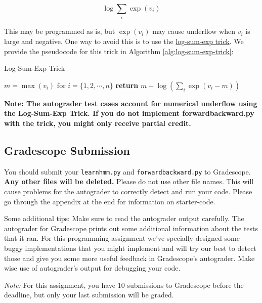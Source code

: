 \documentclass[11pt,addpoints,answers]{exam}
\begin{document}
$$ \log \sum_i \exp{(v_i)}$$

This may be programmed as is, but $\exp{(v_i)}$ may cause underflow when $v_i$ is large and negative. One way to avoid this is to use the \href{https://www.xarg.org/2016/06/the-log-sum-exp-trick-in-machine-learning/}{log-sum-exp trick}. We provide the pseudocode for this trick in Algorithm \ref{alg:log-sum-exp-trick}:

\begin{algorithm}[H]
    \caption{Log-Sum-Exp Trick}
    \label{alg:log-sum-exp-trick}
    \begin{algorithmic}[1]
            \State $m = \max(v_i)$ for $i=\{1, 2,\cdots, n\}$ 
            \State \textbf{return }{$m + \log(\sum_i\exp(v_i-m))$} 
        \EndProcedure
    \end{algorithmic}
\end{algorithm}

\textbf{Note: The autograder test cases account for numerical underflow using the Log-Sum-Exp Trick. If you do not implement \textbf{forwardbackward.py} with the trick, you might only receive partial credit.}

\subsection{Gradescope Submission}

You should submit your \texttt{learnhmm.py} and \texttt{forwardbackward.py} to Gradescope. \textbf{Any other files will be deleted.} Please do not use other file names. This will cause problems for the autograder to correctly detect and run your code. Please go through the appendix at the end for information on starter-code.

Some additional tips: 
Make sure to read the autograder output carefully. The autograder for Gradescope prints out some additional 
information about the tests that it ran. For this programming assignment we’ve specially designed some buggy implementations that you might implement and will try our best to detect those and give you some more useful feedback in Gradescope’s autograder. Make wise use of autograder’s output for debugging your code.


\textit{Note:} For this assignment, you have 10 submissions to Gradescope before the deadline, but only your last submission will be graded.
\end{document}
